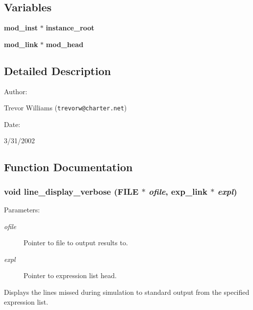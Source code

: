 \subsection*{Variables}
\begin{CompactItemize}
\item 
{\bf mod\_\-inst} $\ast$ {\bf instance\_\-root}
\item 
{\bf mod\_\-link} $\ast$ {\bf mod\_\-head}
\end{CompactItemize}


\subsection{Detailed Description}


\begin{Desc}
\item[Author: ]\par
Trevor Williams ({\tt trevorw@charter.net}) \end{Desc}
\begin{Desc}
\item[Date: ]\par
3/31/2002\end{Desc}


\subsection{Function Documentation}
\subsubsection{\setlength{\rightskip}{0pt plus 5cm}void line\_\-display\_\-verbose (FILE $\ast$ {\em ofile}, {\bf exp\_\-link} $\ast$ {\em expl})}\label{line_8c_a5}


\begin{Desc}
\item[Parameters: ]\par
\begin{description}
\item[{\em 
ofile}]Pointer to file to output results to. \item[{\em 
expl}]Pointer to expression list head.\end{description}
\end{Desc}
Displays the lines missed during simulation to standard output from the specified expression list. 
